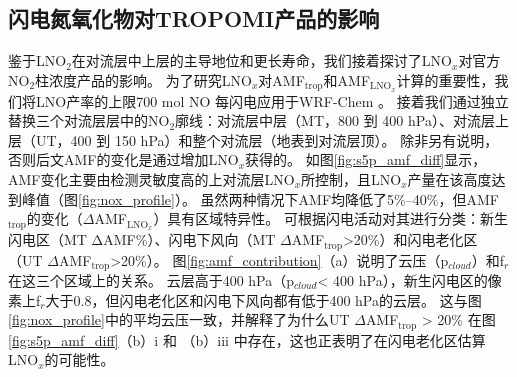 \subsection{闪电氮氧化物对TROPOMI产品的影响}  \label{sec:lnox_affects_tropomi}

鉴于LNO$_2$在对流层中上层的主导地位和更长寿命，我们接着探讨了LNO$_x$对官方NO$_2$柱浓度产品的影响。
为了研究LNO$_x$对AMF$_\textrm{trop}$和AMF$_\textrm{LNO$_x$}$计算的重要性，我们将LNO产率的上限700 mol NO 每闪电\citep{Ott.2010}应用于WRF-Chem 。
接着我们通过独立替换三个对流层层中的NO$_2$廓线：对流层中层（MT，800 到 400 hPa）、对流层上层（UT，400 到 150 hPa）和整个对流层（地表到对流层顶）。
除非另有说明，否则后文AMF的变化是通过增加LNO$_x$获得的。
如图\ref{fig:s5p_amf_diff}显示，AMF变化主要由检测灵敏度高的上对流层LNO$_x$所控制\citep{Beirle.2009,Laughner.2017}，且LNO$_x$产量在该高度达到峰值（图\ref{fig:nox_profile}）。
虽然两种情况下AMF均降低了5\%--40\%，但AMF$_\textrm{trop}$的变化（$\Delta$AMF$_\textrm{LNO$_x$}$）具有区域特异性。
可根据闪电活动对其进行分类：新生闪电区（MT ΔAMF\%）、闪电下风向（MT $\Delta$AMF$_\textrm{trop}$>20\%）和闪电老化区（UT $\Delta$AMF$_\textrm{trop}$>20\%）。
图\ref{fig:amf_contribution}（a）说明了云压（p$_{cloud}$）和f$_r$在这三个区域上的关系。
云层高于400 hPa（p$_{cloud}$< 400 hPa），新生闪电区的像素上f$_r$大于0.8，但闪电老化区和闪电下风向都有低于400 hPa的云层。
这与图\ref{fig:nox_profile}中的平均云压一致，并解释了为什么UT $\Delta$AMF$_\textrm{trop}$ > 20\% 在图\ref{fig:s5p_amf_diff}（b）i 和 （b）iii 中存在，这也正表明了在闪电老化区估算LNO$_x$的可能性。


